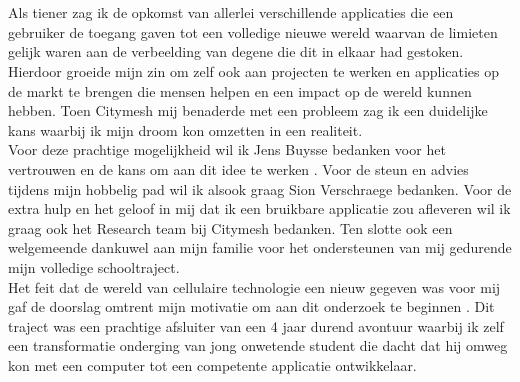 
\chapter*{}%
\label{ch:voorwoord}


Als tiener zag ik de opkomst van allerlei verschillende applicaties die een gebruiker de toegang gaven tot een volledige nieuwe wereld waarvan de limieten gelijk waren aan de verbeelding van degene die dit in elkaar had gestoken. Hierdoor groeide mijn zin om zelf ook aan projecten te werken en applicaties op de markt te brengen die mensen helpen en een impact op de wereld kunnen hebben. Toen Citymesh mij benaderde met een probleem zag ik een duidelijke kans waarbij ik mijn droom kon omzetten in een realiteit. \\

Voor deze prachtige mogelijkheid wil ik Jens Buysse bedanken voor het vertrouwen en de kans om aan dit idee te werken . Voor de steun en advies tijdens mijn hobbelig pad wil ik alsook graag Sion Verschraege bedanken. Voor de extra hulp en het geloof in mij dat ik een bruikbare applicatie zou afleveren wil ik graag ook het Research team bij Citymesh bedanken. Ten slotte ook een welgemeende dankuwel aan mijn familie voor het ondersteunen van mij gedurende mijn volledige schooltraject. \\

Het feit dat de wereld van cellulaire technologie een nieuw gegeven was voor mij gaf de doorslag omtrent mijn motivatie om aan dit onderzoek te beginnen . Dit traject was een prachtige afsluiter van een 4 jaar durend avontuur waarbij ik zelf een transformatie onderging van jong onwetende student die dacht dat hij omweg kon met een computer tot een competente applicatie ontwikkelaar.